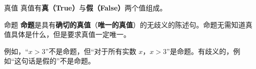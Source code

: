 
\begin{definition}{真值}
真值有\textbf{真（True）}与\textbf{假（False）}两个值组成。
\end{definition}

\begin{definition}{命题}
\textbf{命题}是具有\textbf{确切的真值}（\textbf{唯一的真值}）的无歧义的陈述句。命题无需知道真值具体是什么，但是要求真值一定唯一。
\end{definition}
例如，“$x>3$”不是命题，但“对于所有实数 $x$，$x>3$”是命题。有歧义的，例如“这句话是假的”不是命题。


